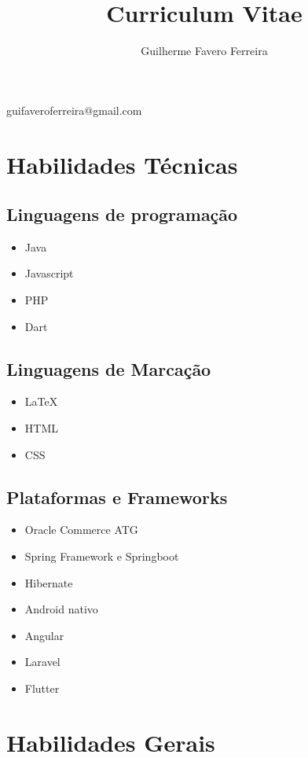 \documentclass{article}
\makeatletter
\renewcommand{\maketitle}{
\begin{center}
{\huge\bfseries\theauthor}

\vspace{.25em}

guifaveroferreira@gmail.com

\end{center}
}
\makeatother
\begin{document}
\title{Curriculum Vitae}
\author{Guilherme Favero Ferreira}
\date{}

\maketitle

\section{Habilidades Técnicas}

\subsection{Linguagens de programação}

\begin{itemize}
\item Java
\item Javascript
\item PHP
\item Dart
\end{itemize}

\subsection{Linguagens de Marcação}

\begin{itemize}
\item {\LaTeX}
\item HTML
\item CSS
\end{itemize}

\subsection{Plataformas e Frameworks}

\begin{itemize}
\item Oracle Commerce ATG
\item Spring Framework  e Springboot
\item Hibernate
\item Android nativo
\item Angular
\item Laravel
\item Flutter
\end{itemize}

\section{Habilidades Gerais}
\end{document}
